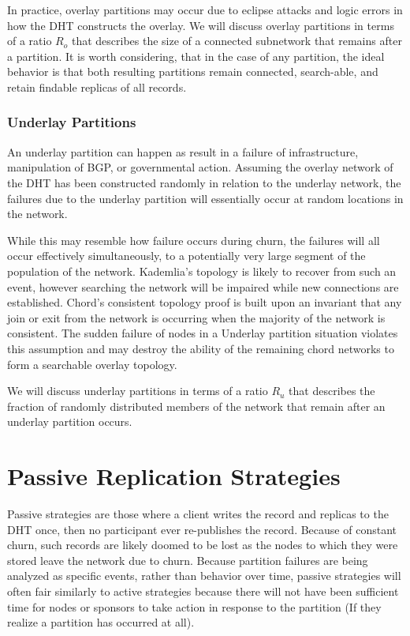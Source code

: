\documentclass[conference]{IEEEtran}
\begin{document}
In practice, overlay partitions may occur due to eclipse attacks and logic errors in how the DHT constructs the overlay.
We will discuss overlay partitions in terms of a ratio $R_{o}$ that describes the size of a connected subnetwork that remains after a partition.
It is worth considering, that in the case of any partition, the ideal behavior is that both resulting partitions remain connected, search-able, and retain findable replicas of all records.


\subsubsection{Underlay Partitions}
An underlay partition can happen as result in a failure of infrastructure, manipulation of BGP, or governmental action.
Assuming the overlay network of the DHT has been constructed randomly in relation to the underlay network, the failures due to the underlay partition will essentially occur at random locations in the network. 

While this may resemble how failure occurs during churn, the failures will all occur effectively simultaneously, to a potentially very large segment of the population of the network.
Kademlia's topology is likely to recover from such an event, however searching the network will be impaired while new connections are established.
Chord's consistent topology proof is built upon an invariant that any join or exit from the network is occurring when the majority of the network is consistent. 
The sudden failure of nodes in a Underlay partition situation violates this assumption and may destroy the ability of the remaining chord networks to form a searchable overlay topology.

We will discuss underlay partitions in terms of a ratio $R_{u}$ that describes the fraction of randomly distributed members of the network that remain after an underlay partition occurs. 

\section{Passive Replication Strategies}

Passive strategies are those where a client writes the record and replicas to the DHT once, then no participant ever re-publishes the record.
Because of constant churn, such records are likely doomed to be lost as the nodes to which they were stored leave the network due to churn.
Because partition failures are being analyzed as specific events, rather than behavior over time, passive strategies will often fair similarly to active strategies because there will not have been sufficient time for nodes or sponsors to take action in response to the partition (If they realize a partition has occurred at all).
\end{document}
